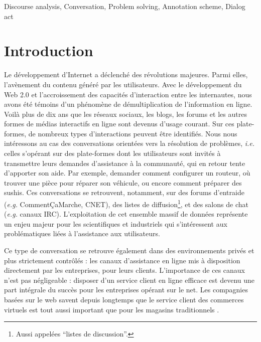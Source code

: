 \documentclass[10pt,a4paper,twoside]{article}
\newcommand{\quotes}[1]{``#1''}
\begin{document}
{Discourse analysis, Conversation, Problem solving, Annotation scheme, Dialog act}


\section{Introduction}
\label{sec:introduction}

Le développement d'Internet a déclenché des révolutions majeures. Parmi elles, l'avènement du contenu généré par les utilisateurs. Avec le développement du Web 2.0 et l'accroissement des capacités d'interaction entre les internautes, nous avons été témoins d'un phénomène de démultiplication de l'information en ligne. Voilà plus de dix ans que les réseaux sociaux, les blogs, les forums et les autres formes de médias interactifs en ligne sont devenus d'usage courant. Sur ces plate-formes, de nombreux types d'interactions peuvent être identifiés. Nous nous intéressons au cas des conversations orientées vers la résolution de problèmes, \textit{i.e.} celles s'opérant sur des plate-formes dont les utilisateurs sont invités à transmettre leurs demandes d'assistance à la communauté, qui en retour tente d'apporter son aide. Par exemple, demander comment configurer un routeur, où trouver une pièce pour réparer son véhicule, ou encore comment préparer des sushis. Ces conversations se retrouvent, notamment, sur des forums d'entraide (\textit{e.g.} CommentÇaMarche, CNET), des listes de diffusion\footnote{Aussi appelées \quotes{listes de discussion}.}, et des salons de chat (\textit{e.g.} canaux IRC). L'exploitation de cet ensemble massif de données représente un enjeu majeur pour les scientifiques et industriels qui s'intéressent aux problématiques liées à l'assistance aux utilisateurs.

Ce type de conversation se retrouve également dans des environnements privés et plus strictement contrôlés : les canaux d'assistance en ligne mis à disposition directement par les entreprises, pour leurs clients. L'importance de ces canaux n'est pas négligeable : disposer d'un service client en ligne efficace est devenu une part intégrale du succès pour les entreprises opérant sur le net. Les compagnies basées sur le web savent depuis longtemps que le service client des commerces virtuels est tout aussi important que pour les magasins traditionnels \cite{bernett2000e}.
\end{document}
